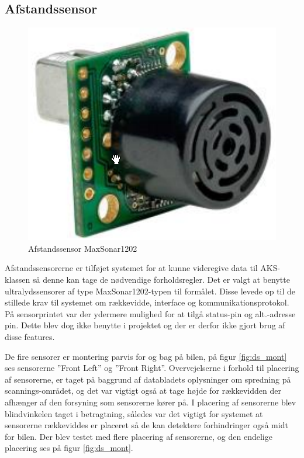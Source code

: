 \subsection{Afstandssensor}

\begin{figure}[h]
	\centering
	\includegraphics[scale=0.4]{../fig/billeder/distancesensor.png}
	\caption{Afstandssensor MaxSonar1202}
	\label{fig:ds_pic}
\end{figure}

Afstandssensorerne er tilføjet systemet for at kunne videregive data til AKS-klassen så denne kan tage de nødvendige forholdsregler. 
Det er valgt at benytte ultralydssensorer af type MaxSonar1202-typen \cite{lib:maxsonar} til formålet. 
Disse levede op til de stillede krav til systemet om rækkevidde, interface og kommunikationsprotokol.
På sensorprintet var der ydermere mulighed for at tilgå status-pin og alt.-adresse pin. 
Dette blev dog ikke benytte i projektet og der er derfor ikke gjort brug af disse features.

De fire sensorer er montering parvis for og bag på bilen, på figur \ref{fig:ds_mont} ses sensorerne ''Front Left'' og ''Front Right''. 
Overvejelserne i forhold til placering af sensorerne, er taget på baggrund af databladets oplysninger om spredning på scannings-området, og det var vigtigt også at tage højde for rækkevidden der afhænger af den forsyning som sensorerne kører på. 
I placering af sensorerne blev blindvinkelen taget i betragtning, således var det vigtigt for systemet at sensorerne rækkeviddes er placeret så de kan detektere forhindringer også midt for bilen. 
Der blev testet med flere placering af sensorerne, og den endelige placering ses på figur \ref{fig:ds_mont}.  


